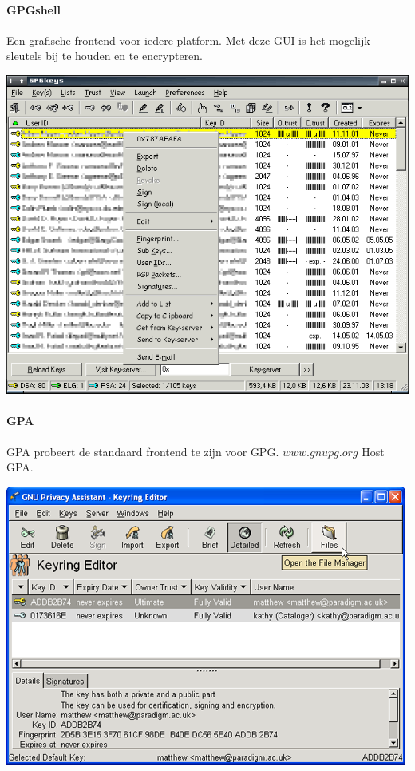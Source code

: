 \documentclass[12pt]{article}
\begin{document}
\paragraph{GPGshell}
Een grafische frontend voor iedere platform. Met deze GUI is het mogelijk sleutels bij te houden en te encrypteren. 
\begin{center}
\includegraphics[scale=0.5]{Pictures/gpgshell}
\end{center}

\paragraph{GPA}
GPA probeert de standaard frontend te zijn voor GPG. $www.gnupg.org$ Host GPA.
\begin{center}
\includegraphics[scale=0.6]{Pictures/GPA}
\end{center}
\end{document}
